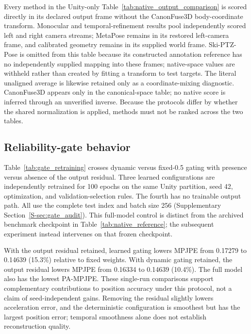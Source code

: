 \documentclass[preprint,12pt]{elsarticle}
\begin{document}
Every method in the Unity-only Table~\ref{tab:native_output_comparison} is scored directly in its declared output frame without the CanonFuse3D body-coordinate transform. Monocular and temporal-refinement results pool independently scored left and right camera streams; MetaPose remains in its restored left-camera frame, and calibrated geometry remains in its supplied world frame. Ski-PTZ-Pose is omitted from this table because its constructed annotation reference has no independently supplied mapping into these frames; native-space values are withheld rather than created by fitting a transform to test targets. The literal unaligned average is likewise retained only as a coordinate-mixing diagnostic. CanonFuse3D appears only in the canonical-space table; no native score is inferred through an unverified inverse. Because the protocols differ by whether the shared normalization is applied, methods must not be ranked across the two tables.

\FloatBarrier
\subsection{Reliability-gate behavior}

Table~\ref{tab:gate_retraining} crosses dynamic versus fixed-0.5 gating with presence versus absence of the output residual. Three learned configurations are independently retrained for 100 epochs on the same Unity partition, seed 42, optimization, and validation-selection rules. The fourth has no trainable output path. All use the complete test index and batch size 256 (Supplementary Section~\ref{S-sec:gate_audit}). This full-model control is distinct from the archived benchmark checkpoint in Table~\ref{tab:native_reference}; the subsequent experiment instead intervenes on that frozen checkpoint.



With the output residual retained, learned gating lowers MPJPE from 0.17279 to 0.14639 (15.3\%) relative to fixed weights. With dynamic gating retained, the output residual lowers MPJPE from 0.16334 to 0.14639 (10.4\%). The full model also has the lowest PA-MPJPE. These single-run comparisons support complementary contributions to position accuracy under this protocol, not a claim of seed-independent gains. Removing the residual slightly lowers acceleration error, and the deterministic configuration is smoothest but has the largest position error; temporal smoothness alone does not establish reconstruction quality.
\end{document}
